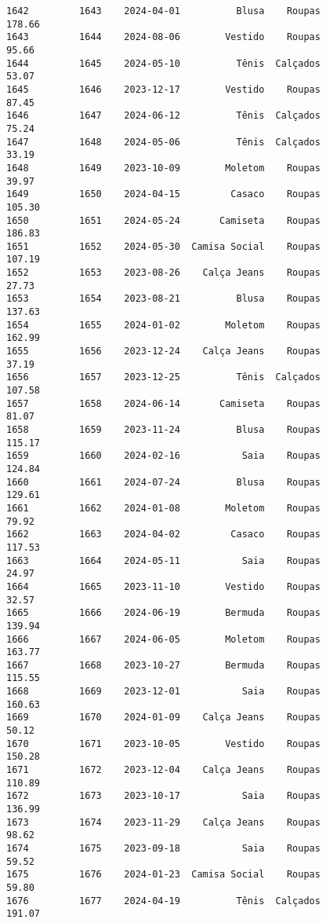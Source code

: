 \documentclass[11pt]{article}
\begin{document}
\begin{Verbatim}[commandchars=\\\{\}]
1642         1643    2024-04-01          Blusa    Roupas          178.66   
1643         1644    2024-08-06        Vestido    Roupas           95.66   
1644         1645    2024-05-10          Tênis  Calçados           53.07   
1645         1646    2023-12-17        Vestido    Roupas           87.45   
1646         1647    2024-06-12          Tênis  Calçados           75.24   
1647         1648    2024-05-06          Tênis  Calçados           33.19   
1648         1649    2023-10-09        Moletom    Roupas           39.97   
1649         1650    2024-04-15         Casaco    Roupas          105.30   
1650         1651    2024-05-24       Camiseta    Roupas          186.83   
1651         1652    2024-05-30  Camisa Social    Roupas          107.19   
1652         1653    2023-08-26    Calça Jeans    Roupas           27.73   
1653         1654    2023-08-21          Blusa    Roupas          137.63   
1654         1655    2024-01-02        Moletom    Roupas          162.99   
1655         1656    2023-12-24    Calça Jeans    Roupas           37.19   
1656         1657    2023-12-25          Tênis  Calçados          107.58   
1657         1658    2024-06-14       Camiseta    Roupas           81.07   
1658         1659    2023-11-24          Blusa    Roupas          115.17   
1659         1660    2024-02-16           Saia    Roupas          124.84   
1660         1661    2024-07-24          Blusa    Roupas          129.61   
1661         1662    2024-01-08        Moletom    Roupas           79.92   
1662         1663    2024-04-02         Casaco    Roupas          117.53   
1663         1664    2024-05-11           Saia    Roupas           24.97   
1664         1665    2023-11-10        Vestido    Roupas           32.57   
1665         1666    2024-06-19        Bermuda    Roupas          139.94   
1666         1667    2024-06-05        Moletom    Roupas          163.77   
1667         1668    2023-10-27        Bermuda    Roupas          115.55   
1668         1669    2023-12-01           Saia    Roupas          160.63   
1669         1670    2024-01-09    Calça Jeans    Roupas           50.12   
1670         1671    2023-10-05        Vestido    Roupas          150.28   
1671         1672    2023-12-04    Calça Jeans    Roupas          110.89   
1672         1673    2023-10-17           Saia    Roupas          136.99   
1673         1674    2023-11-29    Calça Jeans    Roupas           98.62   
1674         1675    2023-09-18           Saia    Roupas           59.52   
1675         1676    2024-01-23  Camisa Social    Roupas           59.80   
1676         1677    2024-04-19          Tênis  Calçados          191.07   

\end{Verbatim}
\end{document}
